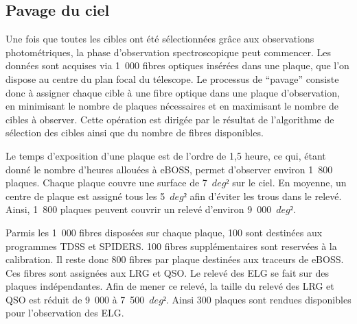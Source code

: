 \documentclass[11pt, twoside, a4paper, openright]{report}
\begin{document}

\subsection{Pavage du ciel}

Une fois que toutes les cibles ont été sélectionnées grâce aux observations photométriques, la phase d'observation spectroscopique peut commencer. Les données sont acquises via 1~000 fibres optiques insérées dans une plaque, que l'on dispose au centre du plan focal du télescope. 
Le processus de ``pavage'' consiste donc à assigner chaque cible à une fibre optique dans une plaque d'observation, en minimisant le nombre de plaques nécessaires et en maximisant le nombre de cibles à observer. Cette opération est dirigée par le résultat de l'algorithme de sélection des cibles ainsi que du nombre de fibres disponibles.

Le temps d'exposition d'une plaque est de l'ordre de 1,5 heure, ce qui, étant donné le nombre d'heures allouées à eBOSS, permet d'observer environ 1~800 plaques.
Chaque plaque couvre une surface de 7~$deg²$ sur le ciel. En moyenne, un centre de plaque est assigné tous les 5~$deg²$ afin d'éviter les trous dans le relevé. 
Ainsi, 1~800 plaques peuvent couvrir un relevé d'environ 9~000~$deg²$. 

Parmis les 1~000 fibres disposées sur chaque plaque, 100 sont destinées aux programmes TDSS et SPIDERS. 100 fibres supplémentaires sont reservées à la calibration. Il reste donc 800 fibres par plaque destinées aux traceurs de eBOSS. Ces fibres sont assignées aux LRG et QSO. Le relevé des ELG se fait sur des plaques indépendantes. Afin de mener ce relevé, la taille du relevé des LRG et QSO est réduit de 9~000 à 7~500~$deg²$. Ainsi 300 plaques sont rendues disponibles pour l'observation des ELG.
\end{document}
